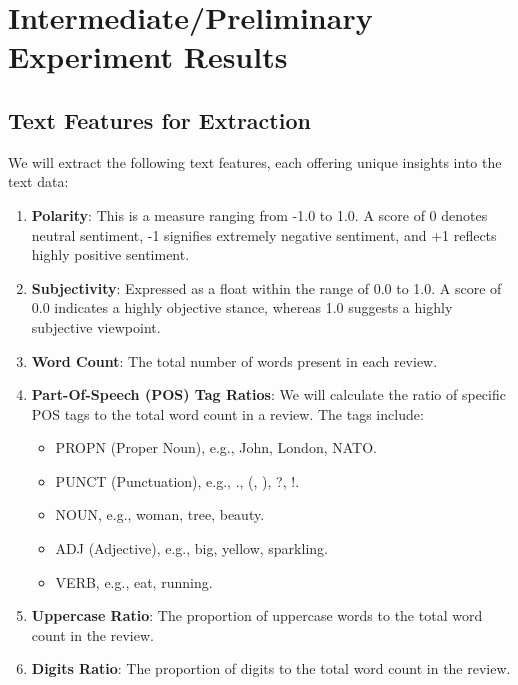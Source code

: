 \documentclass[11pt,a4paper]{article}
\begin{document}
\section{Intermediate/Preliminary Experiment Results}

\subsection{Text Features for Extraction}

We will extract the following text features, each offering unique insights into the text data:

\begin{enumerate}
    \item \textbf{Polarity}: This is a measure ranging from -1.0 to 1.0. A score of 0 denotes neutral sentiment, -1 signifies extremely negative sentiment, and +1 reflects highly positive sentiment.
    \item \textbf{Subjectivity}: Expressed as a float within the range of 0.0 to 1.0. A score of 0.0 indicates a highly objective stance, whereas 1.0 suggests a highly subjective viewpoint.
    \item \textbf{Word Count}: The total number of words present in each review.
    \item \textbf{Part-Of-Speech (POS) Tag Ratios}: We will calculate the ratio of specific POS tags to the total word count in a review. The tags include:
    \begin{itemize}
        \item PROPN (Proper Noun), e.g., John, London, NATO.
        \item PUNCT (Punctuation), e.g., ., (, ), ?, !.
        \item NOUN, e.g., woman, tree, beauty.
        \item ADJ (Adjective), e.g., big, yellow, sparkling.
        \item VERB, e.g., eat, running.
    \end{itemize}
    \item \textbf{Uppercase Ratio}: The proportion of uppercase words to the total word count in the review.
    \item \textbf{Digits Ratio}: The proportion of digits to the total word count in the review.
\end{enumerate}
\end{document}
